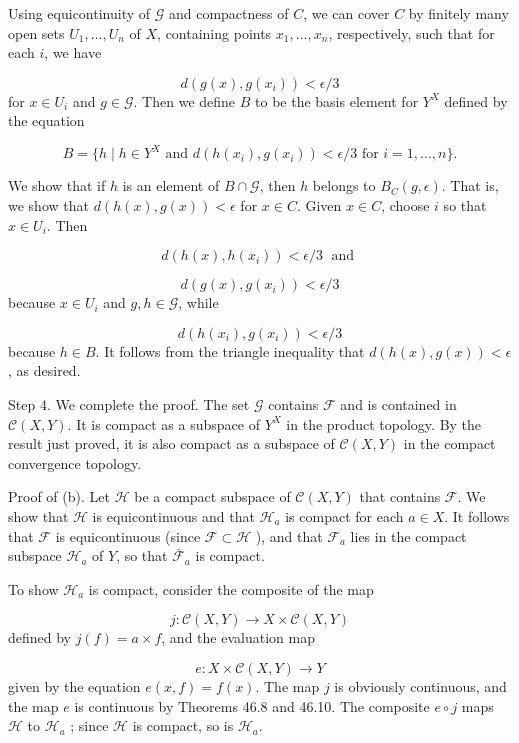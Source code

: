 Using equicontinuity of \(\mathcal{G}\) and compactness of \(C\), we can cover \(C\) by finitely many open sets \(U_{1},\ldots ,U_{n}\) of \(X\), containing points \(x_{1},\ldots ,x_{n}\), respectively, such that for each \(i\), we have

\[
d({g(x),g(x_{i}) }) < \epsilon /3
\]
for \(x \in {U}_{i}\) and \(g \in \mathcal{G}\). Then we define \(B\) to be the basis element for \(Y^{X}\) defined by the equation

\[
B = \{ {h \mid h \in {Y}^{X} \text{ and } d({h(x_{i}),g(x_{i}) }) < \epsilon /3 \text{ for } i = 1,\ldots, n}\} \text{.}
\]

We show that if \(h\) is an element of \(B \cap \mathcal{G}\), then \(h\) belongs to \(B_{C}({g,\epsilon })\). That is, we show that \(d({h(x),g(x) }) < \epsilon\) for \(x \in C\). Given \(x \in C\), choose \(i\) so that \(x \in {U}_{i}\). Then

\[
d({h(x),h(x_{i}) }) < \epsilon /3\;\text{ and }
\]

\[
d({g(x),g(x_{i}) }) < \epsilon /3
\]
because \(x \in {U}_{i}\) and \(g,h \in \mathcal{G}\), while

\[
d({h(x_{i}),g(x_{i}) }) < \epsilon /3
\]
because \(h \in B\). It follows from the triangle inequality that \(d({h(x),g(x) }) < \epsilon\), as desired.

Step 4. We complete the proof. The set \(\mathcal{G}\) contains \(\mathcal{F}\) and is contained in \(\mathcal{C}({X,Y})\). It is compact as a subspace of \(Y^{X}\) in the product topology. By the result just proved, it is also compact as a subspace of \(\mathcal{C}({X,Y})\) in the compact convergence topology.

Proof of (b). Let \(\mathcal{H}\) be a compact subspace of \(\mathcal{C}({X,Y})\) that contains \(\mathcal{F}\). We show that \(\mathcal{H}\) is equicontinuous and that \(\mathcal{H}_{a}\) is compact for each \(a \in X\). It follows that \(\mathcal{F}\) is equicontinuous (since \(\mathcal{F} \subset \mathcal{H}\) ), and that \(\mathcal{F}_{a}\) lies in the compact subspace \(\mathcal{H}_{a}\) of \(Y\), so that \({\bar{\mathcal{F}}}_{a}\) is compact.

To show \(\mathcal{H}_{a}\) is compact, consider the composite of the map

\[
j : \mathcal{C}({X,Y}) \rightarrow X \times \mathcal{C}({X,Y})
\]
defined by \(j( f) = a \times f\), and the evaluation map

\[
e : X \times \mathcal{C}({X,Y}) \rightarrow Y
\]
given by the equation \(e({x,f}) = f(x)\). The map \(j\) is obviously continuous, and the map \(e\) is continuous by Theorems 46.8 and 46.10. The composite \(e \circ j\) maps \(\mathcal{H}\) to \(\mathcal{H}_{a}\) ; since \(\mathcal{H}\) is compact, so is \(\mathcal{H}_{a}\).

